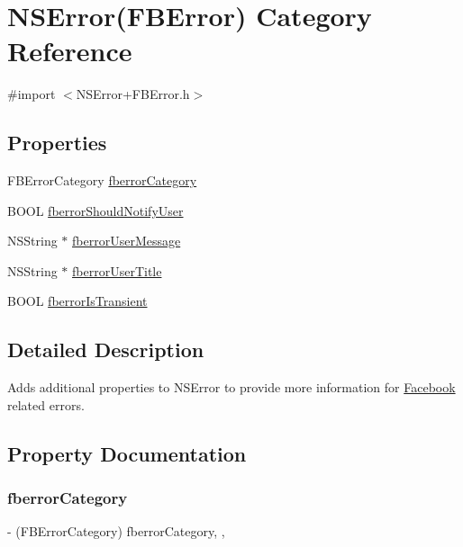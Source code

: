 \hypertarget{categoryNSError_07FBError_08}{}\section{N\+S\+Error(F\+B\+Error) Category Reference}
\label{categoryNSError_07FBError_08}


{\ttfamily \#import $<$N\+S\+Error+\+F\+B\+Error.\+h$>$}

\subsection*{Properties}
\begin{DoxyCompactItemize}
\item 
F\+B\+Error\+Category \hyperlink{categoryNSError_07FBError_08_af1fa6b39d9a25fb7fbb8531996021bb8}{fberror\+Category}
\item 
B\+O\+OL \hyperlink{categoryNSError_07FBError_08_aa6c42b44d37936d83861e190cee733b5}{fberror\+Should\+Notify\+User}
\item 
N\+S\+String $\ast$ \hyperlink{categoryNSError_07FBError_08_a96ac758ea6dba64313a38fe957730a83}{fberror\+User\+Message}
\item 
N\+S\+String $\ast$ \hyperlink{categoryNSError_07FBError_08_a4e7460632037ca8b5750ff586085ae30}{fberror\+User\+Title}
\item 
B\+O\+OL \hyperlink{categoryNSError_07FBError_08_a86c97474af8d8a44eae81bbf654525d4}{fberror\+Is\+Transient}
\end{DoxyCompactItemize}


\subsection{Detailed Description}
Adds additional properties to N\+S\+Error to provide more information for \hyperlink{interfaceFacebook}{Facebook} related errors. 

\subsection{Property Documentation}
\mbox{\label{categoryNSError_07FBError_08_af1fa6b39d9a25fb7fbb8531996021bb8}} 
\subsubsection{\texorpdfstring{fberror\+Category}{fberrorCategory}}
{\footnotesize\ttfamily -\/ (F\+B\+Error\+Category) fberror\+Category\hspace{0.3cm}{\ttfamily [read]}, {\ttfamily [atomic]}, {\ttfamily [assign]}}

